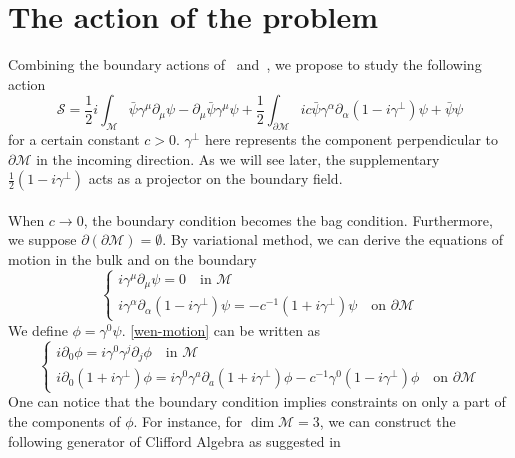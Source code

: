\section{The action of the problem}
Combining the boundary actions of~\cite{Henningson1998} and~\cite{Contino2005}, we propose to study the following action
\begin{equation}\label{wen-action}
\mathcal{S} = \frac{1}{2}i\int_{\mathcal{M}} \bar{\psi} \gamma^\mu \partial_\mu \psi - \partial_\mu \bar{\psi} \gamma^\mu \psi 
+ \frac{1}{2}\int_{\partial \mathcal{M}} ic \bar{\psi} \gamma^\alpha \partial_\alpha (1 - i \gamma^\bot) \psi
+ \bar{\psi} \psi
\end{equation}
for a certain constant $c >0$. 
$\gamma^\bot$ here represents the component perpendicular to $\partial \mathcal{M}$ in the incoming direction. 
As we will see later, the supplementary $\frac 1 2 (1-i\gamma^\bot)$ acts as a projector on the boundary field.
\\\\
When $c \rightarrow 0$, the boundary condition becomes the bag condition. 
Furthermore, we suppose $\partial(\partial \mathcal{M}) = \emptyset$.
By variational method, we can derive the equations of motion in the bulk and on the boundary
\begin{equation}\label{wen-motion}
\begin{cases}
i \gamma^\mu \partial_\mu \psi = 0  \quad \textrm{in $\mathcal{M}$}\\
i \gamma^\alpha \partial_\alpha (1 - i\gamma^\bot) \psi = - c^{-1}(1 + i\gamma^{\bot}) \psi \quad \textrm{on $\partial \mathcal{M}$}
\end{cases}
\end{equation}
We define $\phi = \gamma^0 \psi$. 
\cref{wen-motion} can be written as 
\begin{equation}\label{wen-maineq}
\begin{cases}
i \partial_0 \phi = i \gamma^0 \gamma^j \partial_j \phi   \quad \textrm{in $\mathcal{M}$}\\
i \partial_0(1 + i\gamma^\bot) \phi = i\gamma^0 \gamma^a \partial_a (1+ i\gamma^\bot)\phi - c^{-1} \gamma^0(1 - i \gamma^{\bot})\phi \quad \textrm{on $\partial \mathcal{M}$}
\end{cases}
\end{equation}
One can notice that the boundary condition implies constraints on only a part of the components of $\phi$. 
For instance, for $\dim \mathcal{M} = 3$, we can construct the following generator of Clifford Algebra as suggested in~\cite{Polchinski1998}
